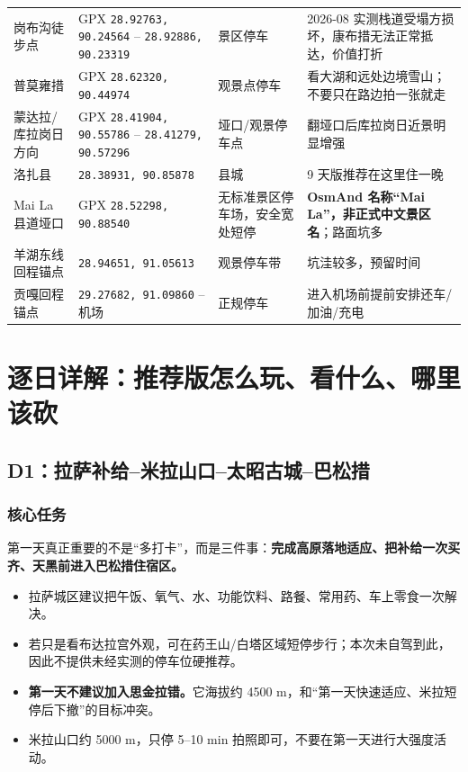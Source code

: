 \documentclass[10.5pt,a4paper]{ctexart}
\newcommand{\coord}[2]{\texttt{#1, #2}}
\begin{document}
\begin{longtable}{p{3.4cm}p{3.6cm}p{4.0cm}p{5.1cm}}
岗布沟徒步点 & GPX \coord{28.92763}{90.24564} -- \coord{28.92886}{90.23319} & 景区停车 & 2026-08 实测栈道受塌方损坏，康布措无法正常抵达，价值打折 \\
普莫雍措 & GPX \coord{28.62320}{90.44974} & 观景点停车 & 看大湖和远处边境雪山；不要只在路边拍一张就走 \\
蒙达拉/库拉岗日方向 & GPX \coord{28.41904}{90.55786} -- \coord{28.41279}{90.57296} & 垭口/观景停车点 & 翻垭口后库拉岗日近景明显增强 \\
洛扎县 & \coord{28.38931}{90.85878} & 县城 & 9 天版推荐在这里住一晚 \\
Mai La 县道垭口 & GPX \coord{28.52298}{90.88540} & 无标准景区停车场，安全宽处短停 & \textbf{OsmAnd 名称“Mai La”，非正式中文景区名}；路面坑多 \\
羊湖东线回程锚点 & \coord{28.94651}{91.05613} & 观景停车带 & 坑洼较多，预留时间 \\
贡嘎回程锚点 & \coord{29.27682}{91.09860} -- 机场 & 正规停车 & 进入机场前提前安排还车/加油/充电 \\
\bottomrule
\end{longtable}

\section{逐日详解：推荐版怎么玩、看什么、哪里该砍}

\subsection{D1：拉萨补给--米拉山口--太昭古城--巴松措}

\subsubsection{核心任务}
第一天真正重要的不是“多打卡”，而是三件事：\textbf{完成高原落地适应、把补给一次买齐、天黑前进入巴松措住宿区。}

\begin{itemize}
  \item 拉萨城区建议把午饭、氧气、水、功能饮料、路餐、常用药、车上零食一次解决。
  \item 若只是看布达拉宫外观，可在药王山/白塔区域短停步行；本次未自驾到此，因此不提供未经实测的停车位硬推荐。
  \item \textbf{第一天不建议加入思金拉错。}它海拔约 4500 m，和“第一天快速适应、米拉短停后下撤”的目标冲突。
  \item 米拉山口约 5000 m，只停 5--10 min 拍照即可，不要在第一天进行大强度活动。
\end{itemize}
\end{document}
